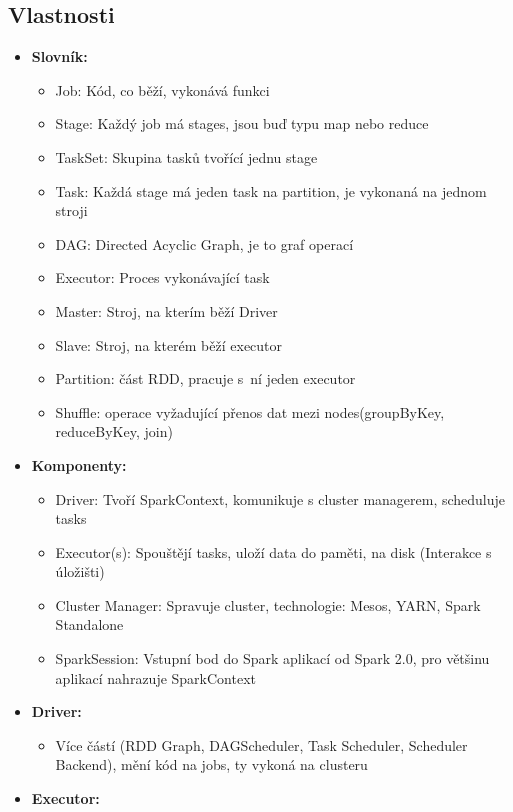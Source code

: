 \subsection{Vlastnosti}
\begin{itemize}
    \item \textbf{Slovník:}
    \begin{itemize}
        \item Job: Kód, co běží, vykonává funkci
        \item Stage: Každý job má stages, jsou buď typu map nebo reduce
        \item TaskSet: Skupina tasků tvořící jednu stage
        \item Task: Každá stage má jeden task na partition, je vykonaná na jednom stroji
        \item DAG: Directed Acyclic Graph, je to graf operací
        \item Executor: Proces vykonávající task
        \item Master: Stroj, na kterím běží Driver
        \item Slave: Stroj, na kterém běží executor
        \item Partition: část RDD, pracuje s~ní jeden executor
        \item Shuffle: operace vyžadující přenos dat mezi nodes(groupByKey, reduceByKey, join)
    \end{itemize}
    \item \textbf{Komponenty:}
    \begin{itemize}
        \item Driver: Tvoří SparkContext, komunikuje s cluster managerem, scheduluje tasks
        \item Executor(s): Spouštějí tasks, uloží data do paměti, na disk (Interakce s úložišti)
        \item Cluster Manager: Spravuje cluster, technologie: Mesos, YARN, Spark Standalone
        \item SparkSession: Vstupní bod do Spark aplikací od Spark 2.0, pro většinu aplikací nahrazuje SparkContext
    \end{itemize}
    \item \textbf{Driver:}
    \begin{itemize}
        \item Více částí (RDD Graph, DAGScheduler, Task Scheduler, Scheduler Backend), mění kód na jobs, ty vykoná na clusteru
    \end{itemize}
    \item \textbf{Executor:}

\end{itemize}
